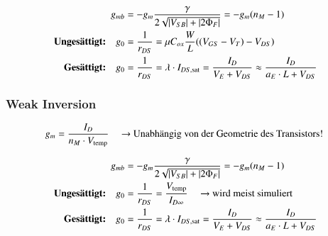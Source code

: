 
\vspace{-0.15cm}

\begin{align*}
                                         g_{mb} &= -g_m \frac{\gamma}{2 \sqrt{\left|V_{SB}\right| + \left|2 \Phi_F\right|}} = - g_m (n_M - 1)                                     \\
    \text{ \textbf{Ungesättigt:}} \quad     g_0 &= \frac{1}{r_{DS}} = \mu C_{ox} \frac{W}{L} ((V_{GS} - V_T) - V_{DS})                                              \\
    \text{ \textbf{Gesättigt:}} \quad       g_0 &=  \frac{1}{r_{DS}} = \lambda \cdot I_{DS, \rm sat} = \frac{I_D}{V_E + V_{DS}} \approx \frac{I_D}{a_E \cdot L + V_{DS}}
\end{align*}


\subsubsection{Weak Inversion}

\vspace{-0.3cm}

\[
    g_m = \frac{I_D}{n_M \cdot V_\text{temp}} \quad \text{ \textrightarrow\ Unabhängig von der Geometrie des Transistors!}
\]


\vspace{-0.15cm}

\begin{align*}
                                         g_{mb} &= -g_m \frac{\gamma}{2 \sqrt{\abs{V_{SB}} + \abs{2 \Phi_F}}} = - g_m (n_M - 1)                                             \\
    \text{ \textbf{Ungesättigt:}} \quad     g_0 &= \frac{1}{r_{DS}} = \frac{V_{\text{temp}}}{I_{D \infty}} \quad \text{ \textrightarrow\ wird meist simuliert}              \\
    \text{ \textbf{Gesättigt:}} \quad       g_0 &=  \frac{1}{r_{DS}} = \lambda \cdot  I_{DS, \rm sat} = \frac{I_D}{V_E + V_{DS}}  \approx \frac{I_D}{a_E \cdot L + V_{DS}}
\end{align*}


